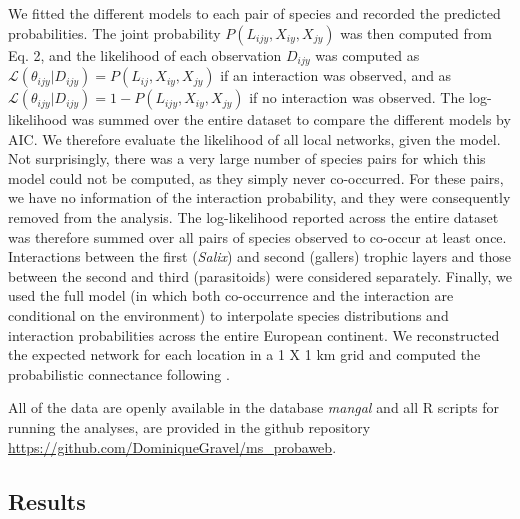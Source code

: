 \documentclass[12pt]{article}
\begin{document}
We fitted the different models to each pair of species and recorded the
predicted probabilities. The joint probability $P(L_{ijy},X_{iy},X_{jy})$ was
then computed from Eq. 2, and the likelihood of each observation $D_{ijy}$ was computed
as $\mathcal{L}(\theta_{ijy}|D_{ijy})=P(L_{ij},X_{iy},X_{jy})$ if an
interaction was observed, and as $\mathcal{L}(\theta_{ijy}|D_{ijy}) =
1-P(L_{ijy}, X_{iy}, X_{jy})$ if no interaction was observed. The log-likelihood was summed over the entire dataset to compare the different models
by AIC. We therefore evaluate the likelihood of all local networks, given the
model. Not surprisingly, there was a very large number of species pairs for
which this model could not be computed, as they simply never co-occurred. For
these pairs, we have no information of the interaction probability, and they
were consequently removed from the analysis. The log-likelihood reported
across the entire dataset was therefore summed over all pairs of species observed to co-occur at least once. Interactions between the first (\textit{Salix}) and
second (gallers) trophic layers and those between the second and third
(parasitoids) were considered separately. Finally, we used the full model (in
which both co-occurrence and the interaction are conditional on the
environment) to interpolate species distributions and interaction
probabilities across the entire European continent. We reconstructed the
expected network for each location in a 1 X 1 km grid and computed the
probabilistic connectance following \citet{Poisot2015c}.
 
All of the data are openly available in the database \emph{mangal}
\citep{Poisot2015b} and all R scripts for running the analyses, are provided
in the github repository 
\url{https://github.com/DominiqueGravel/ms_probaweb}.

\subsection*{Results}
\end{document}
